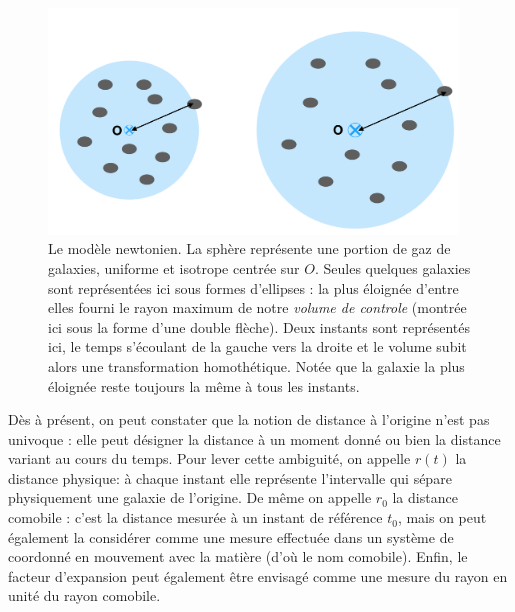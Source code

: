 \begin{figure}[htbp]
	\centering
		\includegraphics[height=6cm]{figs/newton.png}
	\caption{Le modèle newtonien. La sphère représente une portion de gaz de galaxies, uniforme et isotrope centrée sur $O$. Seules quelques galaxies sont représentées ici sous formes d'ellipses : la plus éloignée d'entre elles fourni le rayon maximum de notre \textit{volume de controle} (montrée ici sous la forme d'une double flèche). Deux instants sont représentés ici, le temps s'écoulant de la gauche vers la droite et le volume subit alors une transformation homothétique. Notée que la galaxie la plus éloignée reste toujours la même à tous les instants.}
	\label{f:newton}
\end{figure}

Dès à présent, on peut constater que la notion de distance à l'origine n'est pas univoque : elle peut désigner la distance à un moment donné ou bien la distance variant au cours du temps. Pour lever cette ambiguité, on appelle $r(t)$ la distance physique: à chaque instant elle représente l'intervalle qui sépare physiquement une galaxie de l'origine. De même on appelle $r_0$ la distance  comobile : c'est la distance mesurée à un instant de référence $t_0$, mais on peut également la considérer comme une mesure effectuée dans un système de coordonné en mouvement avec la matière (d'où le nom comobile). Enfin, le facteur d'expansion peut également être envisagé comme une mesure du rayon en unité du rayon comobile.

